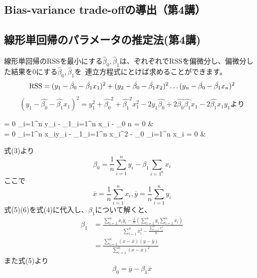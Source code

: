 \documentclass[uplatex]{jsarticle}
\begin{document}
\subsection{Bias-variance trade-offの導出（第4講）}



\subsection{線形単回帰のパラメータの推定法(第4講)}
線形単回帰の{\rm RSS}を最小にする$\hat{\beta}_0, \hat{\beta}_1$は、ぞれぞれで{\rm RSS}を偏微分し、偏微分した結果を0にする$\hat{\beta}_0, \hat{\beta}_1$を\
連立方程式にとけば求めることができます。
$${\rm {\rm RSS}} = (y_1 - \hat{\beta_0} - \hat{\beta_1}x_1)^2 +  (y_2 - \hat{\beta_0} - \hat{\beta_1}x_2)^2 \ldots  (y_n - \hat{\beta_0} - \hat{\beta_1}x_n)^2$$
$$(y_1 - \hat{\beta_0} - \hat{\beta_1}x_1)^2 = y_1^2 + \hat{\beta_0}^2 + \hat{\beta_1}^2x_1^2 - 2y_1\hat{\beta_0} + 2\hat{\beta_0}\hat{\beta_1}x_1 -2\hat{\beta_1}x_1y_1より$$
\begin{numcases}
  {}
   = 0 \iff \sum_{i=1}^n y_i - \beta_1\sum_{i=1}^n x_i - \beta_0 n = 0  & \\
  \frac{\partial {\rm RSS}}{\partial \hat{\beta_1}} = 0 \iff \sum_{i=1}^n x_iy_i - \beta_1\sum_{i=1}^n x_i^2 - \beta_0 \sum_{i=1}^n x_i = 0  &
\end{numcases}
式(3)より
\begin{equation}
  \beta_0 = \frac{1}{n}\sum_{i=1}^n y_i - \beta_1\sum_{i=1^n}x_i
\end{equation}
ここで
\begin{equation}
  \overline{x} = \frac{1}{n}\sum_{i=1}^n x_i, \overline{y} = \frac{1}{n}\sum_{i=1}^n y_i
\end{equation}
式(5)(6)を式(4)に代入し、$\beta_1$について解くと、
\begin{equation*}
  \begin{split}
    \beta_1 &=  \frac{\sum_{i=1}^n x_iy_i - \frac{1}{n}(\sum_{i=1}^n y_i\sum_{i=1}^n x_i)}{\sum_{i=1}^n x_i^2 - \frac{\sum_{i=1}^n x_i^2}{n}} \\
    &= \frac{\sum_{i=1}^n(x - \overline{x})(y - \overline{y})}{\sum_{i=1}^n (x - \overline{x})^2}
  \end{split}
\end{equation*}
また式(5)より
$$\beta_0 = \overline{y} - \beta_1\overline{x}$$
\end{document}
